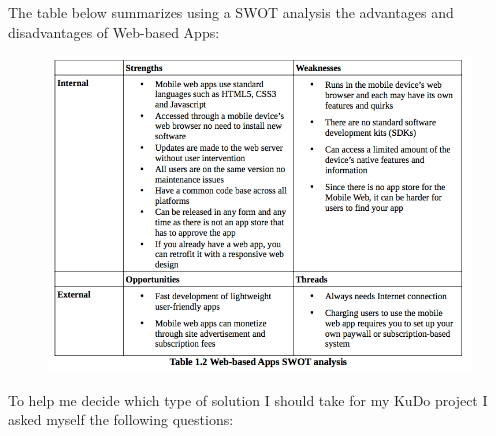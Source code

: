 \documentclass[a4paper,12pt]{book}
\begin{document}
The table below summarizes using a SWOT analysis the advantages and disadvantages of Web-based Apps:

\begin{figure}[H]
    \centering
    \includegraphics[width=12cm, keepaspectratio]{img/table12.png}
 \end{figure}

To help me decide which type of solution I should take for my KuDo project I asked myself the following questions:
\end{document}
